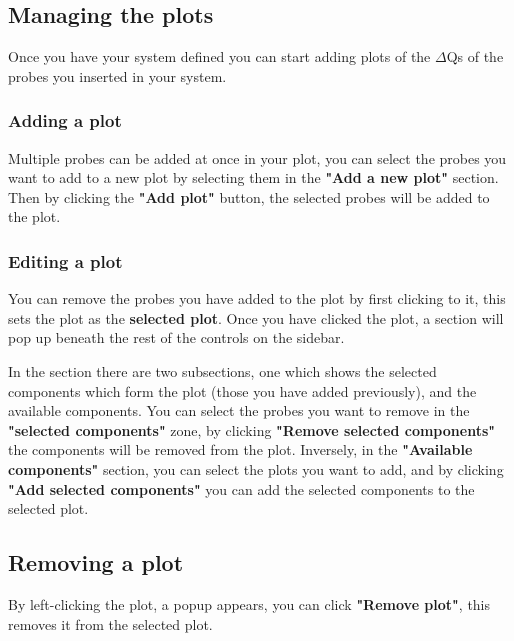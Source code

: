 \subsection{Managing the plots} 
    Once you have your system defined you can start adding plots of the $\Delta$Qs of the probes you inserted in your system.
    
    \subsubsection{Adding a plot}

    Multiple probes can be added at once in your plot, you can select the probes you want to add to a new plot by selecting them in the \textbf{"Add a new plot"} section. Then by clicking the \textbf{"Add plot"} button, the selected probes will be added to the plot.

\subsubsection{Editing a plot}
    You can remove the probes you have added to the plot by first clicking to it, this sets the plot as the \textbf{selected plot}. Once you have clicked the plot, a section will pop up beneath the rest of the controls on the sidebar. 
    
    In the section there are two subsections, one which shows the selected components which form the plot (those you have added previously), and the available components. You can select the probes you want to remove in the \textbf{"selected components"} zone, by clicking \textbf{"Remove selected components"} the components will be removed from the plot. Inversely, in the \textbf{"Available components"} section, you can select the plots you want to add, and by clicking \textbf{"Add selected components"} you can add the selected components to the selected plot.

\subsection{Removing a plot}
    By left-clicking the plot, a popup appears, you can click \textbf{"Remove plot"}, this removes it from the selected plot.


